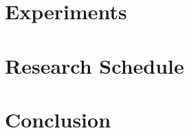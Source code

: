 \documentclass[a4paper, 12pt]{article}
\begin{document}
\section{Experiments} \label{sec:exp}

\section{Research Schedule} \label{sec:sched}

\section{Conclusion} \label{sec:conclusion}



\end{document}
